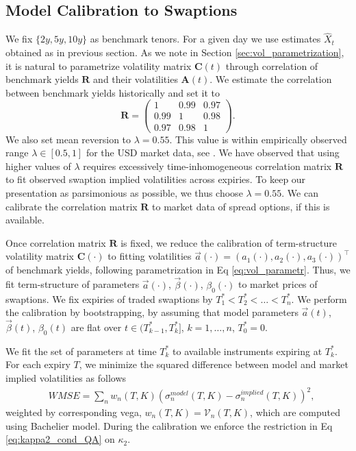 \documentclass[pdftex,11pt,a4paper] {article}
\begin{document}
\subsection{Model Calibration to Swaptions}

We fix $\{2y, 5y, 10y\}$ as benchmark tenors. For a given day we use estimates $\hat X_{t}$ obtained as in previous section. As we note in Section \ref{sec:vol_parametrization}, it is natural to parametrize volatility matrix $\mathbf{C}(t)$ through correlation of benchmark yields $\mathbf{R}$ and their volatilities $\mathbf{A}(t)$. We estimate the correlation between benchmark yields historically and set it to 
\begin{equation*}
\mathbf{R}=
\begin{pmatrix}
1 & 0.99 & 0.97 \\
0.99 & 1 & 0.98 \\
0.97 & 0.98 & 1 
\end{pmatrix}.
\end{equation*}
We also set mean reversion to $\lambda=0.55$. This value is within empirically observed range  $\lambda\in[0.5, 1]$ for the USD market data, see \cite{ChristensenDiebold2009}. We have observed that using higher values of $\lambda$ requires excessively time-inhomogeneous correlation matrix $\mathbf{R}$ to fit observed swaption implied volatilities across expiries. To keep our presentation as parsimonious as possible, we thus choose $\lambda=0.55$. We can calibrate the correlation matrix $\mathbf{R}$ to market data of spread options, if this is available. 


Once correlation matrix $\mathbf{R}$ is fixed, we reduce the calibration of term-structure volatility matrix $\mathbf{C}(\cdot)$ to fitting volatilities $\vec{a}(\cdot)=(a_1(\cdot), a_2(\cdot), a_3(\cdot))^\top$ of benchmark yields, following parametrization in Eq \eqref{eq:vol_parametr}. Thus, we fit term-structure of parameters $\vec{a}(\cdot)$, $\vec{\beta}(\cdot)$, $\beta_0(\cdot)$ to market prices of swaptions. We fix expiries of traded swaptions by $T_1^*<T_2^*<\ldots<T_n^*$. We perform the calibration by bootstrapping, by assuming that model parameters $\vec{a}(t)$, $\vec{\beta}(t)$, $\beta_0(t)$ are flat over $t\in (T_{k-1}^*,T_k^*]$, $k=1,\ldots,n$, $T_0^{*}=0$.

We fit the set of parameters at time $T_k^*$ to available instruments expiring at $T_k^*$. For each expiry $T$, we minimize the squared difference between model and market implied volatilities as follows
\begin{equation} \label{eq:mf1}
\begin{split}
& WMSE = \sum_{n} w_{n}(T,K)\left( \sigma^{model}_{n}(T,K) - \sigma^{implied}_{n}(T,K)  \right) ^{2},
\end{split}
\end{equation}
weighted by corresponding vega, $w_{n}(T,K)=\mathcal{V}_{n}(T,K)$, which are computed using Bachelier model. During the calibration we enforce the restriction in Eq \eqref{eq:kappa2_cond_QA} on $\kappa_2$. 
\end{document}

